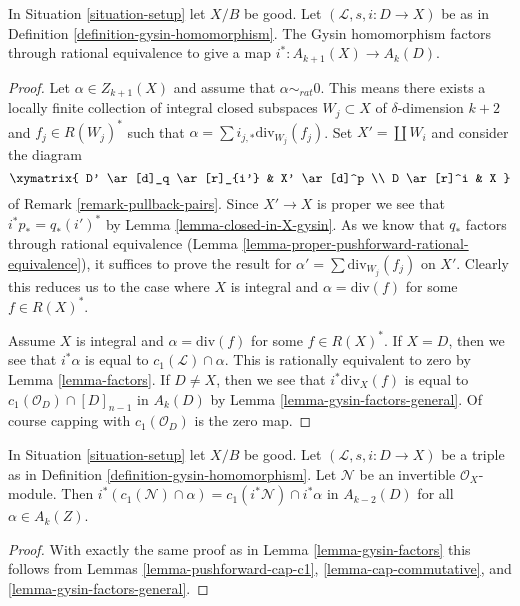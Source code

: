 \begin{lemma}
\label{lemma-gysin-factors}
In Situation \ref{situation-setup} let $X/B$ be good.
Let $(\mathcal{L}, s, i : D \to X)$ be as in
Definition \ref{definition-gysin-homomorphism}.
The Gysin homomorphism factors through rational equivalence to
give a map $i^* : A_{k + 1}(X) \to A_k(D)$.
\end{lemma}

\begin{proof}
Let $\alpha \in Z_{k + 1}(X)$ and assume that $\alpha \sim_{rat} 0$.
This means there exists a locally finite collection of integral
closed subspaces $W_j \subset X$ of $\delta$-dimension $k + 2$
and $f_j \in R(W_j)^*$ such that
$\alpha = \sum i_{j, *}\text{div}_{W_j}(f_j)$.
Set $X' = \coprod W_i$ and consider the diagram
$$
\xymatrix{
D' \ar[d]_q \ar[r]_{i'} & X' \ar[d]^p \\
D \ar[r]^i & X
}
$$
of Remark \ref{remark-pullback-pairs}. Since $X' \to X$ is proper
we see that $i^*p_* = q_*(i')^*$ by Lemma \ref{lemma-closed-in-X-gysin}.
As we know that $q_*$ factors through rational equivalence
(Lemma \ref{lemma-proper-pushforward-rational-equivalence}), it suffices
to prove the result for $\alpha' = \sum \text{div}_{W_j}(f_j)$
on $X'$. Clearly this reduces us to the case where $X$ is integral
and $\alpha = \text{div}(f)$ for some $f \in R(X)^*$.

\medskip\noindent
Assume $X$ is integral and $\alpha = \text{div}(f)$ for some $f \in R(X)^*$.
If $X = D$, then we see that $i^*\alpha$ is equal
to $c_1(\mathcal{L}) \cap \alpha$.
This is rationally equivalent to zero by Lemma \ref{lemma-factors}.
If $D \not = X$, then we see that $i^*\text{div}_X(f)$ is equal to
$c_1(\mathcal{O}_D) \cap [D]_{n - 1}$ in $A_k(D)$ by
Lemma \ref{lemma-gysin-factors-general}. Of course
capping with $c_1(\mathcal{O}_D)$ is the zero map.
\end{proof}

\begin{lemma}
\label{lemma-gysin-commutes-cap-c1}
In Situation \ref{situation-setup} let $X/B$ be good.
Let $(\mathcal{L}, s, i : D \to X)$
be a triple as in Definition \ref{definition-gysin-homomorphism}.
Let $\mathcal{N}$ be an invertible $\mathcal{O}_X$-module.
Then $i^*(c_1(\mathcal{N}) \cap \alpha) = c_1(i^*\mathcal{N}) \cap i^*\alpha$
in $A_{k - 2}(D)$ for all $\alpha \in A_k(Z)$.
\end{lemma}

\begin{proof}
With exactly the same proof as in Lemma \ref{lemma-gysin-factors}
this follows from Lemmas
\ref{lemma-pushforward-cap-c1},
\ref{lemma-cap-commutative}, and
\ref{lemma-gysin-factors-general}.
\end{proof}

